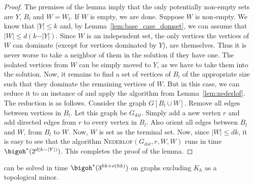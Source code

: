 \begin{proof}
The premises of the lemma imply that the only potentially non-empty sets are $Y$, $B_l$ and $W=W_l$. If $W$ is empty, we are done. Suppose $W$ is non-empty. 
We know that $\vert Y\vert \leq k$ and, by Lemma~\ref{lem:base_case_domset}, we can assume that $\vert W\vert \leq d(k-\vert Y\vert)$. 
Since $W$ is an independent set, the only vertices the vertices of $W$ can dominate (except for vertices dominated by $Y$), are themselves. Thus it is never worse to take a neighbor of them in the solution if they have one. The isolated vertices from $W$ can be simply moved to $Y$, as we have to take them into the solution. Now, it remains to find a set of vertices of $B_l$ of the appropriate size such that they dominate the remaining vertices of $W$. But in this case, we can reduce it to an instance of {\dst} and apply the algorithm from Lemma~\ref{lem:nederlof}.
The reduction is as follows. Consider the graph $G[B_l\cup W]$. Remove all edges between vertices in $B_l$. Let this graph be $G_{dst}$. Simply add a new vertex $r$ and add directed edges from $r$ to every vertex in $B_l$. Also orient all edges between $B_l$ and $W$, from $B_l$ to $W$. Now, $W$ is set as the terminal set. Now, since $\vert W\vert\leq dk$, it is easy to see that the algorithm \textsc{Nederlof}$(G_{dst},r, W,W)$ runs in time $\bigoh^*(2^{d(k-|Y|)})$.
 This completes the proof of the lemma. 
\end{proof}









\begin{theorem}\label{thm:top_algo_ds}
 {\ds} can be solved in time $\bigoh^*(3^{hk+o(hk)})$ on graphs excluding $K_h$ as a topological minor.
\end{theorem}


